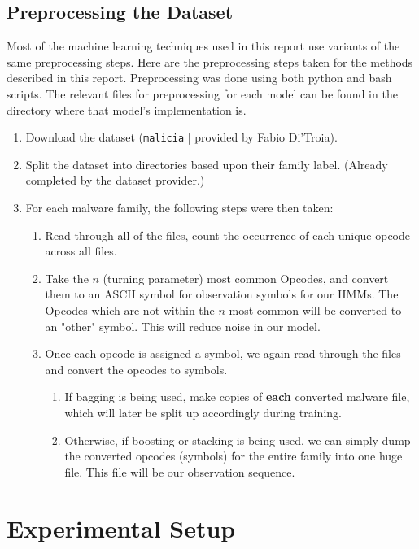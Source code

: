 \documentclass[12pt]{article}
\begin{document}
\subsection{Preprocessing the Dataset}
Most of the machine learning techniques used in this report use variants of the same preprocessing steps. Here are the preprocessing steps taken for the methods described in this report. Preprocessing was done using both python and bash scripts. The relevant files for preprocessing for each model can be found in the directory where that model's implementation is.
  \begin{enumerate}
  \item Download the dataset (\texttt{malicia} | provided by Fabio Di'Troia).
    \item Split the dataset into directories based upon their family label. (Already completed by the dataset provider.)
    \item For each malware family, the following steps were then taken:
      \begin{enumerate}
        \item Read through all of the files, count the occurrence of each unique opcode across all files.
        \item Take the $n$ (turning parameter) most common Opcodes, and convert them to an ASCII symbol for observation symbols for our HMMs. The Opcodes which are not within the $n$ most common will be converted to an "other" symbol. This will reduce noise in our model.
        \item Once each opcode is assigned a symbol, we again read through the files and convert the opcodes to symbols.
        \begin{enumerate}
          \item If bagging is being used, make copies of \textbf{each} converted malware file, which will later be split up accordingly during training.
          \item Otherwise, if boosting or stacking is being used, we can simply dump the converted opcodes (symbols) for the entire family into one huge file. This file will be our observation sequence.
        \end{enumerate}
      \end{enumerate}
  \end{enumerate}




\section{Experimental Setup}
\end{document}
